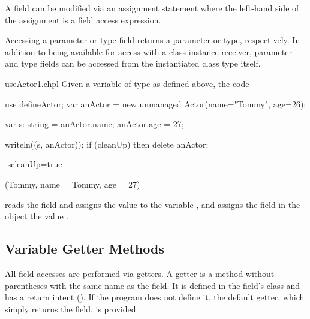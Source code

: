 
A field can
be modified via an assignment statement where the left-hand side of
the assignment is a field access expression.

Accessing a parameter or type field returns a parameter or type,
respectively. In addition to being available for access with a class
instance receiver, parameter and type fields can be accessed from the
instantiated class type itself.

\begin{chapelexample}{useActor1.chpl}
Given a variable  of type  as defined above,
the code
\begin{chapelpre}
use defineActor;
var anActor = new unmanaged Actor(name="Tommy", age=26);
\end{chapelpre}
\begin{chapel}
var s: string = anActor.name;
anActor.age = 27;
\end{chapel}
\begin{chapelpost}
writeln((s, anActor));
if (cleanUp) then delete anActor;
\end{chapelpost}
\begin{chapelcompopts}
-scleanUp=true
\end{chapelcompopts}
\begin{chapeloutput}
(Tommy, {name = Tommy, age = 27})
\end{chapeloutput}
reads the field  and assigns the value to the variable
, and assigns the field  in the object
 the value .
\end{chapelexample}

\subsection{Variable Getter Methods}
\label{Getter_Methods}

All field accesses are performed via getters.  A getter is a method without
parentheses with the same name as the field. It is defined in the field's class
and has a  return intent ().  If the program
does not define it, the default getter, which simply returns the field, is
provided.


